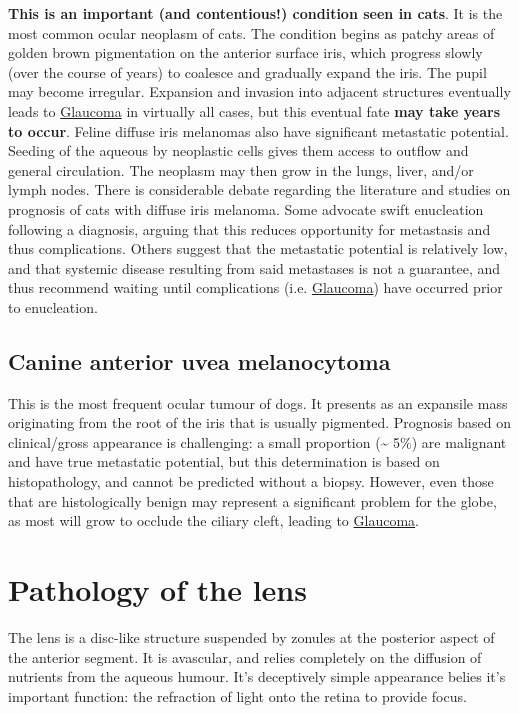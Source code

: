 \documentclass[openany]{book}
\begin{document}
\textbf{This is an important (and contentious!) condition seen in cats}.
It is the most common ocular neoplasm of cats. The condition begins as
patchy areas of golden brown pigmentation on the anterior surface iris,
which progress slowly (over the course of years) to coalesce and
gradually expand the iris. The pupil may become irregular. Expansion and
invasion into adjacent structures eventually leads to
\protect\hyperlink{glaucoma}{Glaucoma} in virtually all cases, but this
eventual fate \textbf{may take years to occur}. Feline diffuse iris
melanomas also have significant metastatic potential. Seeding of the
aqueous by neoplastic cells gives them access to outflow and general
circulation. The neoplasm may then grow in the lungs, liver, and/or
lymph nodes. There is considerable debate regarding the literature and
studies on prognosis of cats with diffuse iris melanoma. Some advocate
swift enucleation following a diagnosis, arguing that this reduces
opportunity for metastasis and thus complications. Others suggest that
the metastatic potential is relatively low, and that systemic disease
resulting from said metastases is not a guarantee, and thus recommend
waiting until complications (i.e.
\protect\hyperlink{glaucoma}{Glaucoma}) have occurred prior to
enucleation.

\hypertarget{canine-anterior-uvea-melanocytoma}{\section{Canine anterior
uvea melanocytoma}\label{canine-anterior-uvea-melanocytoma}}

This is the most frequent ocular tumour of dogs. It presents as an
expansile mass originating from the root of the iris that is usually
pigmented. Prognosis based on clinical/gross appearance is challenging:
a small proportion (\textasciitilde{} 5\%) are malignant and have true
metastatic potential, but this determination is based on histopathology,
and cannot be predicted without a biopsy. However, even those that are
histologically benign may represent a significant problem for the globe,
as most will grow to occlude the ciliary cleft, leading to
\protect\hyperlink{glaucoma}{Glaucoma}.

\hypertarget{pathology-of-the-lens}{\chapter{Pathology of the
lens}\label{pathology-of-the-lens}}

The lens is a disc-like structure suspended by zonules at the posterior
aspect of the anterior segment. It is avascular, and relies completely
on the diffusion of nutrients from the aqueous humour. It's deceptively
simple appearance belies it's important function: the refraction of
light onto the retina to provide focus.
\end{document}
